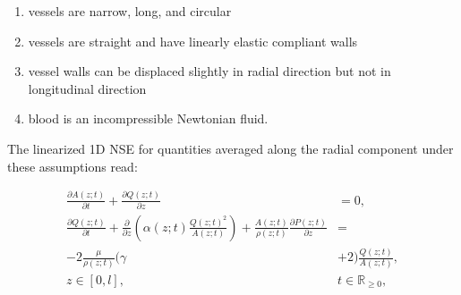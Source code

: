 \documentclass[a4paper, oneside]{discothesis}
\begin{document}
\begin{enumerate}
	\item vessels are narrow, long, and circular
	\item vessels are straight and have linearly elastic compliant walls
	\item vessel walls can be displaced slightly in radial direction but not in longitudinal direction
	\item blood is an incompressible Newtonian fluid.
\end{enumerate}

The linearized 1D NSE for quantities averaged along the radial component under these assumptions read:

\begin{equation}
		\begin{aligned} 
			\frac{\partial A(z;t)}{\partial t} + \frac{\partial Q(z;t)}{\partial z} &= 0, \\ 
			\frac{\partial Q(z;t)}{\partial t} + \frac{\partial}{\partial z}\left(\alpha(z;t) \frac{Q(z;t)^2}{A(z;t)} \right) + \frac{A(z;t)}{\rho(z;t)} \frac{\partial P(z;t)}{\partial z} &= \\
			-2 \frac{\mu}{\rho(z;t)} ( \gamma &+ 2 ) \frac{Q(z;t)}{A(z;t)}, \\
			z \in [0,l],\ & t \in \mathbb{R}_{\geq 0}, 
		\end{aligned} \label{eq:1Deqs1}
\end{equation}
\end{document}
